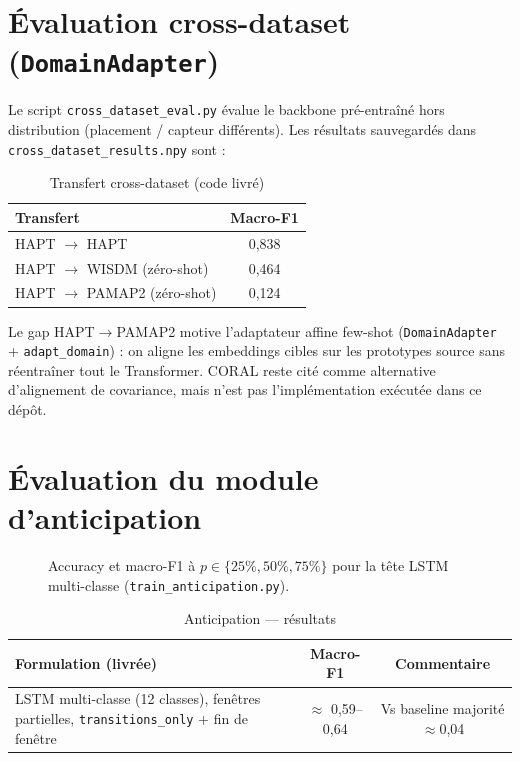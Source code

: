 \section{Évaluation cross-dataset (\texttt{DomainAdapter})}

Le script \texttt{cross\_dataset\_eval.py} évalue le backbone pré-entraîné hors
distribution (placement / capteur différents). Les résultats sauvegardés dans
\texttt{cross\_dataset\_results.npy} sont :

\begin{table}[H]
\centering
\small
\begin{tabularx}{0.88\textwidth}{|Y|c|}
\hline
\textbf{Transfert} & \textbf{Macro-F1} \\
\hline
HAPT $\rightarrow$ HAPT & 0,838 \\
HAPT $\rightarrow$ WISDM (zéro-shot) & 0,464 \\
HAPT $\rightarrow$ PAMAP2 (zéro-shot) & 0,124 \\
\hline
\end{tabularx}
\caption{Transfert cross-dataset (code livré)}
\label{tab:coral_results}
\end{table}

Le gap HAPT$\rightarrow$PAMAP2 motive l'adaptateur affine few-shot
(\texttt{DomainAdapter} + \texttt{adapt\_domain}) : on aligne les embeddings
cibles sur les prototypes source sans réentraîner tout le Transformer.
CORAL \parencite{sun2016} reste cité comme alternative d'alignement de
covariance, mais n'est pas l'implémentation exécutée dans ce dépôt.

\section{Évaluation du module d'anticipation}

\begin{figure}[H]
  \centering
  \caption[Résultats anticipation multi-classe]{Accuracy et macro-F1 à
  $p \in \{25\%, 50\%, 75\%\}$ pour la tête LSTM multi-classe
  (\texttt{train\_anticipation.py}).}
  \label{fig:anticipation_eval}
\end{figure}

\begin{table}[H]
\centering
\small
\begin{tabularx}{\textwidth}{|Y|c|c|}
\hline
\textbf{Formulation (livrée)} & \textbf{Macro-F1} & \textbf{Commentaire} \\
\hline
LSTM multi-classe (12 classes),
fenêtres partielles, \texttt{transitions\_only} + fin de fenêtre
& $\approx$ 0,59--0,64 & Vs baseline majorité $\approx$0,04 \\
\hline
\end{tabularx}
\caption{Anticipation — résultats}
\label{tab:anticipation}
\end{table}

